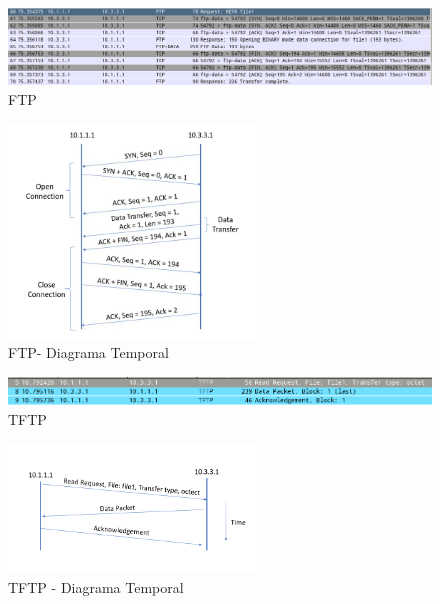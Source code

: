 \documentclass[a4paper]{report}
\begin{document}
\begin{figure}[H]
    \centering 
    \includegraphics[width=\textwidth]{images/2ftp.png}  
    \caption{FTP}
    \label{fig:2ftp}
\end{figure}

\begin{figure}[H]
    \centering 
    \includegraphics[width=0.6\textwidth]{images/diagrama.png}  
    \caption{FTP- Diagrama Temporal}
    \label{fig:diagrama}
\end{figure}

\begin{figure}[H]
    \centering 
    \includegraphics[width=\textwidth]{images/2tftp.png}  
    \caption{TFTP}
    \label{fig:2tft:}
\end{figure}

\begin{figure}[H]
    \centering 
    \includegraphics[width=0.6\textwidth]{images/diagrama2.png}  
    \caption{TFTP - Diagrama Temporal}
    \label{fig:diagrama2}
\end{figure}
\end{document}
